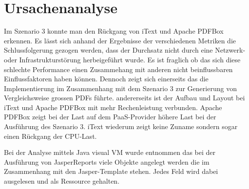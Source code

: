 \documentclass[main.tex]{subfiles}
\begin{document}
\section{Ursachenanalyse}

Im Szenario 3 konnte man den Rückgang von iText und Apache PDFBox erkennen. Es lässt sich anhand der Ergebnisse der verschiedenen Metriken die  Schlussfolgerung gezogen werden, dass der Durchsatz nicht durch eine Netzwerk- oder Infrastrukturstörung herbeigeführt wurde. Es ist fraglich ob das sich diese schlechte Performance einen Zusammehang mit anderen nicht beinflussbaren Einflussfaktoren haben können. Dennoch zeigt sich einerseits das die Implementierung im Zusammenhang mit dem Szenario 3 zur Generierung von Vergleichsweise grossen PDFs führte. andererseits ist der Aufbau und Layout bei iText und Apache PDFBox mit mehr Rechenleistung verbunden. Apache PDFBox zeigt bei der Last auf dem PaaS-Provider höhere Last bei der Ausführung des Szenario 3. iText wiederum zeigt keine Zuname sondern sogar einen Rückgang der CPU-Last. 

Bei der Analyse mittels Java visual VM wurde entnommen das bei der Ausführung von JasperReports viele Objekte angelegt werden die im Zusammenhang mit den Jasper-Template stehen. Jedes Feld wird dabei ausgelesen und als Ressource gehalten. 
\end{document}
